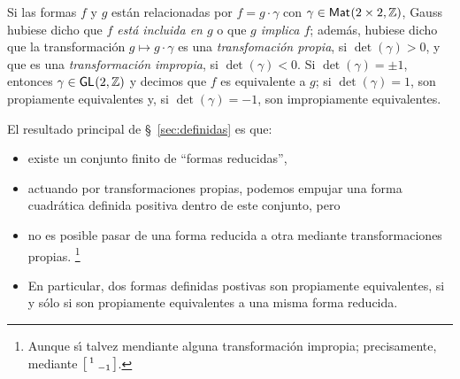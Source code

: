 Si las formas $f$ y $g$ est\'an relacionadas por $f=g\cdot\gamma$
con $\gamma\in\mathsf{Mat}_{}(2\times 2,\mathbb{Z})$, Gauss hubiese dicho que
\emph{$f$ est\'a incluida en $g$} o que \emph{$g$ implica $f$};
adem\'as, hubiese dicho que la transformaci\'on $g\mapsto g\cdot\gamma$
es una \emph{transfomaci\'on propia}, si $\det(\gamma)>0$, y que
es una \emph{transformaci\'on impropia}, si $\det(\gamma)<0$.
\cite[\S~157]{Gauss}
Si $\det(\gamma)=\pm 1$, entonces $\gamma\in\mathsf{GL}_{}(2,\mathbb{Z})$ y
decimos que $f$ es equivalente a $g$; si $\det(\gamma)=1$, son
propiamente equivalentes y, si $\det(\gamma)=-1$, son impropiamente
equivalentes.

El resultado principal de \S~\ref{sec:definidas} es que:
\begin{itemize}
	\item existe un conjunto finito de ``formas reducidas'',
	\item actuando por transformaciones propias,
		podemos empujar una forma cuadr\'atica definida positiva
		dentro de este conjunto, pero
	\item no es posible pasar de una forma reducida a otra mediante
		transformaciones propias.%
		\footnote{
			Aunque s\'{\i} talvez mendiante alguna
			transformaci\'on impropia; precisamente, mediante
			$ \left[\begin{smallmatrix}  1 & \\ & -1  \end{smallmatrix}\right]$.
		}
	\item En particular, dos formas definidas postivas son propiamente
		equivalentes, si y s\'olo si son propiamente equivalentes
		a una misma forma reducida.
\end{itemize}
%

